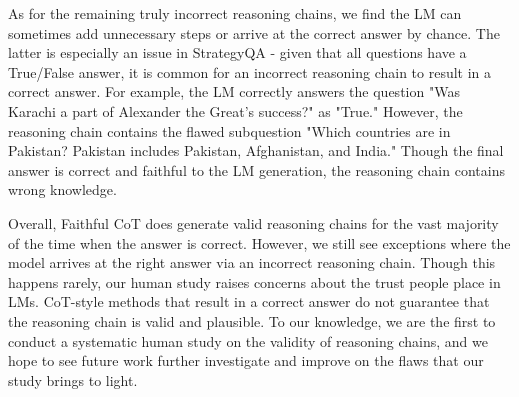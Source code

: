 As for the remaining truly incorrect reasoning chains, we find the LM can sometimes add unnecessary steps or arrive at the correct answer by chance. The latter is especially an issue in StrategyQA - given that all questions have a True/False answer, it is common for an incorrect reasoning chain to result in a correct answer. For example, the LM correctly answers the question "Was Karachi a part of Alexander the Great's success?" as "True." However, the reasoning chain contains the flawed subquestion "Which countries are in Pakistan? Pakistan includes Pakistan, Afghanistan, and India." Though the final answer is correct and faithful to the LM generation, the reasoning chain contains wrong knowledge.


Overall, Faithful CoT does generate valid reasoning chains for the vast majority of the time when the answer is correct. However, we still see exceptions where the model arrives at the right answer via an incorrect reasoning chain. Though this happens rarely, our human study raises concerns about the trust people place in LMs. CoT-style methods that result in a correct answer do not guarantee that the reasoning chain is valid and plausible. To our knowledge, we are the first to conduct a systematic human study on the validity of reasoning chains, and we hope to see future work further investigate and improve on the flaws that our study brings to light. 